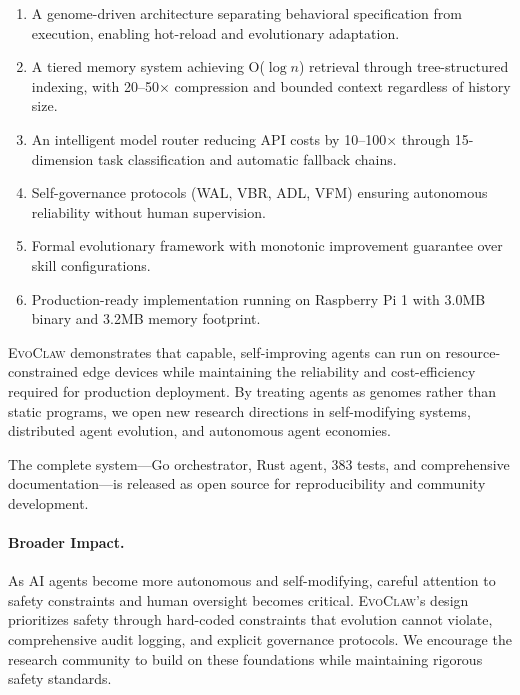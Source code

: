 \documentclass{article}
\newcommand{\evoclaw}{\textsc{EvoClaw}}
\begin{document}
\begin{enumerate}[leftmargin=*]
    \item A genome-driven architecture separating behavioral specification from execution, enabling hot-reload and evolutionary adaptation.
    
    \item A tiered memory system achieving O($\log n$) retrieval through tree-structured indexing, with 20--50$\times$ compression and bounded context regardless of history size.
    
    \item An intelligent model router reducing API costs by 10--100$\times$ through 15-dimension task classification and automatic fallback chains.
    
    \item Self-governance protocols (WAL, VBR, ADL, VFM) ensuring autonomous reliability without human supervision.
    
    \item Formal evolutionary framework with monotonic improvement guarantee over skill configurations.
    
    \item Production-ready implementation running on Raspberry Pi 1 with 3.0MB binary and 3.2MB memory footprint.
\end{enumerate}

\evoclaw{} demonstrates that capable, self-improving agents can run on resource-constrained edge devices while maintaining the reliability and cost-efficiency required for production deployment. By treating agents as genomes rather than static programs, we open new research directions in self-modifying systems, distributed agent evolution, and autonomous agent economies.

The complete system—Go orchestrator, Rust agent, 383 tests, and comprehensive documentation—is released as open source for reproducibility and community development.

\paragraph{Broader Impact.} As AI agents become more autonomous and self-modifying, careful attention to safety constraints and human oversight becomes critical. \evoclaw{}'s design prioritizes safety through hard-coded constraints that evolution cannot violate, comprehensive audit logging, and explicit governance protocols. We encourage the research community to build on these foundations while maintaining rigorous safety standards.
\end{document}
